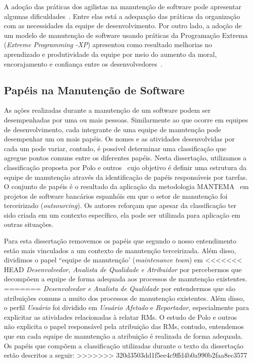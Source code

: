 A adoção das práticas dos agilistas na manutenção de software pode apresentar
algumas dificuldades~\cite{1402140}. Entre elas está a adequação das práticas
da organização com as necessidades da equipe de desenvolvimento. Por outro
lado, a adoção de um modelo de manutenção de software usando práticas da
Programação Extrema (\textit{Extreme Programming \@-\@ XP}) apresentou como
resultado melhorias no aprendizado e produtividade da equipe por meio do
aumento da moral, encorajamento e confiança entre os
desenvolvedores~\cite{Choudhari:2014:EIM:2557833.2557845}.

\subsection{Papéis na Manutenção de Software}\label{subsec:man_visao_geral_papeis_na_manutencao_de_software}

As ações realizadas durante a manutenção de um software podem ser desempenhadas
por uma ou mais pessoas. Similarmente ao que ocorre em equipes de
desenvolvimento, cada integrante de uma equipe de manutenção pode desempenhar
um ou mais papéis. Os nomes e as atividades desenvolvidas por cada um pode
variar, contudo, é possível determinar uma classificação que agregue pontos
comuns entre os diferentes papéis. Nesta dissertação, utilizamos a
classificação proposta por Polo e outros~\cite{Polo1999} cujo objetivo é
definir uma estrutura da equipe de manutenção através da identificação de
papéis responsáveis por tarefas. O conjunto de papéis é o resultado da
aplicação da metodologia MANTEMA~\cite{756695} em projetos de software
bancários espanhóis em que o setor de manutenção foi terceirizado
(\textit{outsourcing}). Os autores reforçam que apesar da classificação ter
sido criada em um contexto específico, ela pode ser utilizada para aplicação em
outras situações.

Para esta dissertação removemos os papéis que segundo o nosso entendimento
estão mais vinculados a um contexto de manutenção terceirizada. Além disso,
dividimos o papel ``equipe de manutenção' (\textit{maintenance team}) em
<<<<<<< HEAD
\textit{Desenvolvedor, Analista de Qualidade e Atribuidor } por percebermos que
decompõem a equipe de forma adequada aos processos de manutenção existentes.
=======
\textit{Desenvolvedor e Analista de Qualidade} por entendermos que são
atribuições comuns a muito dos processos de manutenção existentes. Além disso,
o perfil \textit{Usuário} foi dividido em \textit{Usuário Afetado} e
\textit{Reportador}, especialmente para explicitar as atividades relacionadas à
relatar RMs. O estudo de Polo e outros não explicita o papel responsável pela
atribuição das RMs, contudo, entendemos que em cada equipe de manutenção a
atribuição é realizada de forma adequada. Os papéis que compõem a classificação
utilizadas durante o texto da dissertação estão descritos a seguir:
>>>>>>> 320d3503dd1f5ee4c9ffd4b0a990b2faa8ec3577

